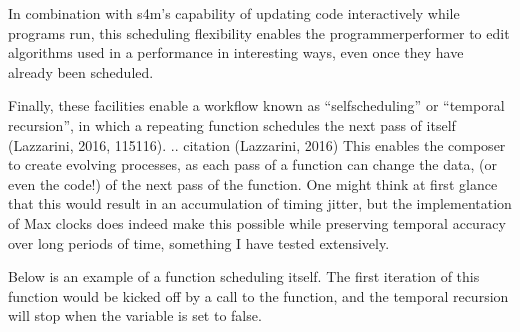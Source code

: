 \documentclass[letterpaper,10pt,english]{sphinxmanual}
\begin{document}
\sphinxAtStartPar
In combination with s4m’s capability of updating code interactively while
programs run, this scheduling flexibility enables the programmer\sphinxhyphen{}performer
to edit algorithms used in a performance in interesting ways, even once
they have already been scheduled.

\sphinxAtStartPar
Finally, these facilities enable a workflow known as
“self\sphinxhyphen{}scheduling” or “temporal recursion”,
in which a repeating function schedules the next pass of itself (Lazzarini, 2016, 115\sphinxhyphen{}116).
.. citation (Lazzarini, 2016)
This enables the composer to create evolving
processes, as each pass of a function can change the data,
(or even the code!) of the next pass of the function. One might think
at first glance that this would result in an accumulation of timing
jitter, but the implementation of Max clocks does indeed make this possible
while preserving temporal accuracy over long periods of time, something
I have tested extensively.

\sphinxAtStartPar
Below is an example of a function scheduling itself. The first iteration
of this function would be kicked off by a call to the  function,
and the temporal recursion will stop when the variable  is set to false.
\end{document}

